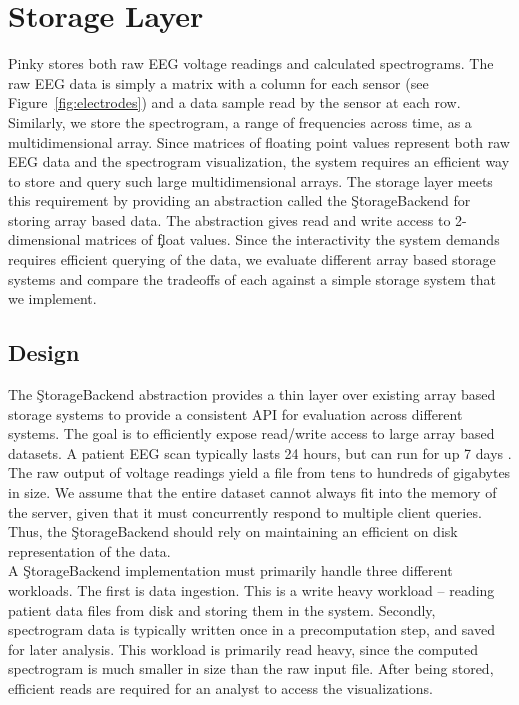 \chapter{Storage Layer}\label{storage-ch}

Pinky stores both raw EEG voltage readings and calculated spectrograms. The raw
EEG data is simply a matrix with a column for each sensor (see
Figure~\ref{fig:electrodes}) and a data sample read by the sensor at each row.
Similarly, we store the spectrogram, a range of frequencies across time, as a
multidimensional array. Since matrices of floating point values represent both
raw EEG data and the spectrogram visualization, the system requires an
efficient way to store and query such large multidimensional arrays. The
storage layer meets this requirement by providing an abstraction called the
\c{StorageBackend} for storing array based data. The abstraction gives read and
write access to 2-dimensional matrices of \c{float} values. Since the
interactivity the system demands requires efficient querying of the data, we
evaluate different array based storage systems and compare the tradeoffs of
each against a simple storage system that we implement.

\section{Design}

The \c{StorageBackend} abstraction provides a thin layer over existing array
based storage systems to provide a consistent API for evaluation across
different systems. The goal is to efficiently expose read/write access to large
array based datasets. A patient EEG scan typically lasts 24 hours, but can run
for up 7 days \cite{ceeg-3}. The raw output of voltage readings yield a file
from tens to hundreds of gigabytes in size. We assume that the entire dataset
cannot always fit into the memory of the server, given that it must
concurrently respond to multiple client queries. Thus, the \c{StorageBackend}
should rely on maintaining an efficient on disk representation of the data. \\

A \c{StorageBackend} implementation must primarily handle three different
workloads. The first is data ingestion. This is a write heavy workload --
reading patient data files from disk and storing them in the system. Secondly,
spectrogram data is typically written once in a precomputation step, and saved
for later analysis. This workload is primarily read heavy, since the computed
spectrogram is much smaller in size than the raw input file.  After being
stored, efficient reads are required for an analyst to access the
visualizations.

